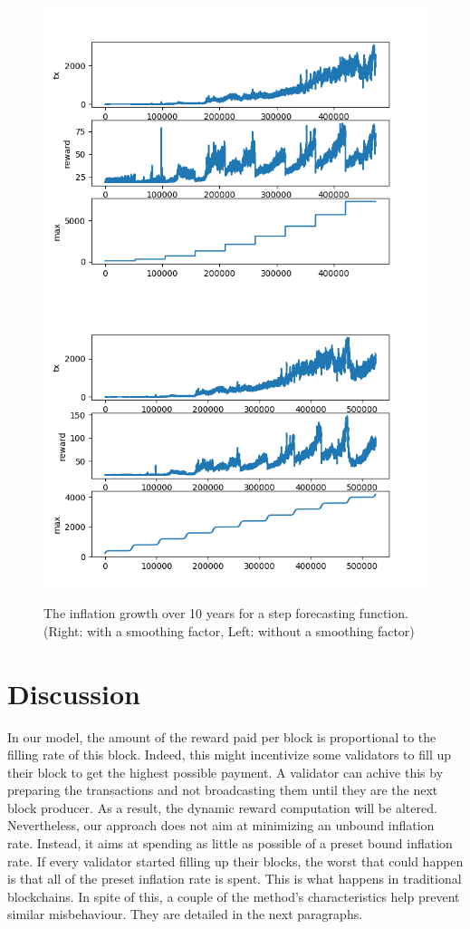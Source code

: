 \documentclass[]{article}
\begin{document}
\begin{figure}[]
	\includegraphics[width=0.49\linewidth, trim= 0cm 0cm 0cm 0cm, clip]{Figures/Figure_steps.png}
	\includegraphics[width=0.49\linewidth, trim= 0cm 0cm 0cm 0cm, clip]{Figures/Figure_steps_smooth.png}
	\caption{The inflation growth over 10 years for a step forecasting function. (Right: with a smoothing factor, Left: without a smoothing factor)}
	\label{fig:sim}
\end{figure}

\section{Discussion}
In our model, the amount of the reward paid per block is proportional to the filling rate of this block. Indeed, this might incentivize some validators to fill up their block to get the highest possible payment. A validator can achive this by preparing the transactions and not broadcasting them until they are the next block producer. As a result, the dynamic reward computation will be altered. Nevertheless, our approach does not aim at minimizing an unbound inflation rate. Instead, it aims at spending as little as possible of a preset bound inflation rate. If every validator started filling up their blocks, the worst that could happen is that all of the preset inflation rate is spent. This is what happens in traditional blockchains. In spite of this, a couple of the method's characteristics help prevent similar misbehaviour. They are detailed in the next paragraphs.
\end{document}
